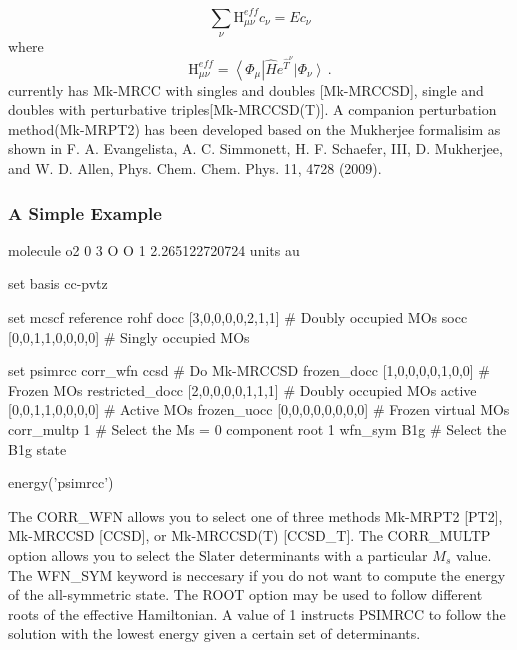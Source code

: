  \begin{equation*}
\sum_\nu \textrm{H}^{eff}_{\mu \nu} c_\nu =E c_\nu
 \end{equation*}
where 
\begin{equation*}
\textrm{H}^{eff}_{\mu \nu} = \left \langle \Phi_\mu \right | \hat{H}e^{\hat{T}^\nu} \left | \Phi_\nu \right \rangle \, \textrm{.}
\end{equation*}
 \PSIfour currently has Mk-MRCC with singles and doubles [Mk-MRCCSD], single and doubles with perturbative triples[Mk-MRCCSD(T)]. A companion perturbation method(Mk-MRPT2) has been developed based on the Mukherjee formalisim as shown in F. A. Evangelista, A. C. Simmonett, H. F. Schaefer, III, D. Mukherjee, and W. D. Allen, Phys. Chem. Chem. Phys. 11, 4728 (2009). 
\\
\subsubsection{A Simple Example}

\begin{Snippet}
molecule o2 {
  0 3
  O
  O 1 2.265122720724
  units au
}

set {
  basis cc-pvtz
}

set mcscf {
  reference       rohf
  docc            [3,0,0,0,0,2,1,1]      # Doubly occupied MOs
  socc            [0,0,1,1,0,0,0,0]      # Singly occupied MOs
}

set psimrcc {
  corr_wfn        ccsd                   # Do Mk-MRCCSD 
  frozen_docc     [1,0,0,0,0,1,0,0]      # Frozen MOs
  restricted_docc [2,0,0,0,0,1,1,1]      # Doubly occupied MOs
  active          [0,0,1,1,0,0,0,0]      # Active MOs
  frozen_uocc     [0,0,0,0,0,0,0,0]      # Frozen virtual MOs
  corr_multp      1                      # Select the Ms = 0 component
  root            1
  wfn_sym         B1g                    # Select the B1g state
}

energy('psimrcc')
\end{Snippet}
The CORR\_WFN allows you to select one of three methods Mk-MRPT2 [PT2], Mk-MRCCSD [CCSD], or Mk-MRCCSD(T) [CCSD\_T].   The CORR\_MULTP option allows you to select the Slater determinants with a particular $M_s$ value. The WFN\_SYM keyword is neccesary if you do not want to compute the energy of the all-symmetric state. The ROOT option may be used to follow different roots of the effective Hamiltonian. A value of 1 instructs PSIMRCC to follow the solution with the lowest energy given a certain set of determinants.          


